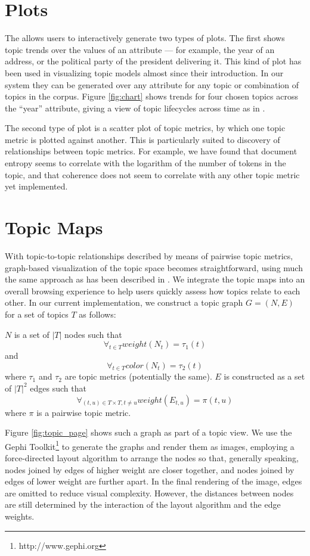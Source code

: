 \documentclass[11pt]{article}
\begin{document}
\section{Plots}\label{sec:plots}
The \tool{} allows users to interactively generate two types of plots. The first
shows topic trends over the values of an attribute --- for example, the year
of an address, or the political party of the president delivering it. This kind
of plot has been used in visualizing topic models almost since their
introduction. In our system they can be generated over any attribute for any
topic or combination of topics in the corpus. Figure \ref{fig:chart} shows
trends for four chosen topics across the ``year'' attribute, giving a view
of topic lifecycles across time as in \cite{Griffiths2004,Wang2006}.

The second type of plot is a scatter plot of topic metrics, by which one topic
metric is plotted against another. This is particularly suited to discovery of
relationships between topic metrics. For example, we have found that document
entropy seems to correlate with the logarithm of the number of tokens in the
topic, and that coherence does not seem to correlate with any other topic metric
yet implemented.

\section{Topic Maps}\label{sec:maps}
With topic-to-topic relationships described by means of pairwise topic metrics,
graph-based visualization of the topic space becomes straightforward, using much
the same approach as has been described in \cite{Newman2010b}. We
integrate the topic maps into an overall browsing experience to help users
quickly assess how topics relate to each other. In our current implementation, we
construct a topic graph $G = (N, E)$ for a set of topics $T$ as follows:

$N$ is a set of $|T|$ nodes such that
\[\forall_{t\in T} weight(N_{t}) = \tau_{1}(t)\]
and
\[\forall_{t\in T} color(N_{t}) = \tau_{2}(t)\]
where $\tau_1$ and $\tau_2$ are topic metrics (potentially the same). $E$ is
constructed as a set of $|T|^2$ edges such that
  \[\forall_{(t,u)\in T\times T, t\neq u} weight(E_{t,u}) = \pi(t,u)\]
where $\pi$ is a pairwise topic metric.

Figure \ref{fig:topic_page} shows such a graph as part of a topic view. We
use the Gephi Toolkit\footnote{http://www.gephi.org} to generate the graphs and
render them as images, employing a force-directed layout algorithm to arrange
the nodes so that, generally speaking, nodes joined by edges of higher weight
are closer together, and nodes joined by edges of lower weight are further
apart. In the final rendering of the image, edges are omitted to reduce visual
complexity. However, the distances between nodes are still determined by the
interaction of the layout algorithm and the edge weights.
\end{document}
